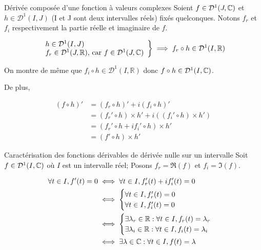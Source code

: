 \documentclass{article}
\begin{document}
\begin{question_kholle}{Dérivée composée d'une fonction à valeurs complexes}
	Soient $f \in \mathcal D ^1(J, \mathbb C) $ et $h \in \mathcal D^1(I, J)$ (I et J sont deux intervalles réels) fixés quelconques. Notons $f_r$ et $f_i$ respectivement la partie réelle et imaginaire de $f$.
	
	\begin{align*}
		\left .
		\begin{array}{ll}
			h \in \mathcal D^1(I, J) \\
			f_r \in \mathcal D^1(J, \mathbb R) \text{, car } f \in \mathcal D^1(J, \mathbb C)
		\end{array}
		\right \}
		\implies f_r \circ h \in \mathcal D^1(I, \mathbb R)
	\end{align*}
	
	On montre de même que $f_i \circ h \in \mathcal D^1(I, \mathbb  R)$ donc $f \circ h \in \mathcal D^1(I, \mathbb C)$.
	
	De plus,
	
	\begin{align*}
		(f \circ h)' &= (f_r \circ h)' + i (f_i \circ h)' \\
		&= (f_r' \circ h ) \times h' + i((f_i' \circ h) \times h') \\
		&=(f_r' \circ h + if_i' \circ h) \times h' \\
		&= (f' \circ h) \times h'
	\end{align*}
\end{question_kholle}

\begin{question_kholle}{Caractérisation des fonctions dérivables de dérivée nulle sur un intervalle}
	Soit $f \in \mathcal D ^1 (I, \mathbb C)$ où $I$ est un intervalle réel;
	Posons $f_r = \Re (f)$ et $f_i = \Im(f)$.
	
	\begin{align*}
	\forall t \in I, f'(t) = 0 &\iff \forall t \in I, f_r'(t) + i f_i'(t) = 0 \\
	&\iff \begin{cases}
		\forall t \in I, f_r'(t) = 0 \\
		\forall t \in I, f_i'(t) = 0
	\end{cases} \\
	&\iff \begin{cases}
		\exists \lambda_r \in \mathbb R : \forall t \in I,  f_r(t) = \lambda_r \\
			\exists \lambda_i \in \mathbb R : \forall t \in I,  f_i(t) = \lambda_i
	\end{cases} \\
	&\iff \exists \lambda \in \mathbb C : \forall t \in I,  f(t) = \lambda
	\end{align*}
\end{question_kholle}
\end{document}
